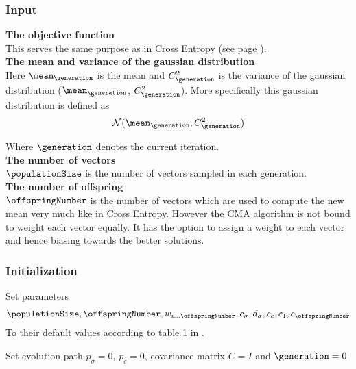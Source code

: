 
\subsubsection{Input}

\textbf{The objective function} \\
This serves the same purpose as in Cross Entropy (see page \pageref{CEObjective}).
\\

\textbf{The mean and variance of the gaussian distribution} \\
Here $\mean_{\generation}$ is the mean and  
$C^{2}_{\generation}$ is the variance 
of the gaussian distribution ($\mean_{\generation}$,
$C^2_{\generation}$). 
More specifically this gaussian distribution is defined as 
\begin{align*}
\mathcal{N}(\mean_{\generation},C^2_{\generation})
\end{align*}

Where $\generation$ denotes the current iteration.\\


\textbf{The number of vectors}\\
$\populationSize$ is the number of vectors sampled in each generation.
\\

\textbf{The number of offspring}\\
$\offspringNumber$ is the number of vectors which are used to compute 
the new mean very much like in Cross Entropy. However the CMA algorithm
is not bound to weight each vector equally. It has the option to assign 
a weight to each vector and hence biasing towards the better solutions.
\\


\subsubsection{Initialization}


Set parameters
\begin{align*}
\populationSize, \offspringNumber, w_{i \dots \offspringNumber}, c_{\sigma}, d_{\sigma}, c_c, c_1, c_{\offspringNumber}
\end{align*}
To their default values according to table 1 in \citep{hansen2011}.

Set evolution path $p_{\sigma} = 0$, $p_{c} = 0$, covariance matrix $C = I$ and $\generation = 0$

